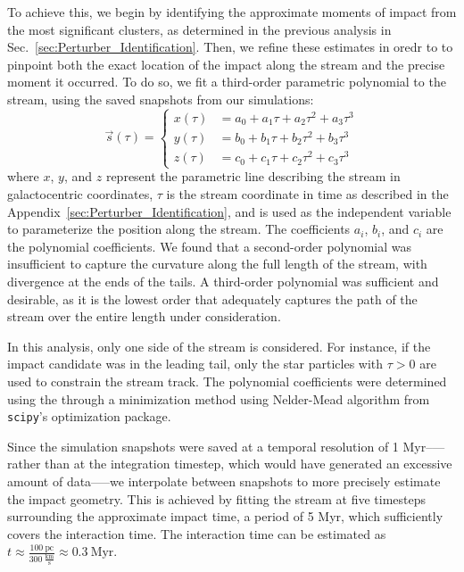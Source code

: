 \documentclass{aa}
\begin{document}
\begin{appendix}
      To achieve this, we begin by identifying the approximate moments of impact from the most significant clusters, as determined in the previous analysis in Sec.~\ref{sec:Perturber_Identification}. Then, we refine these estimates in oredr to to pinpoint both the exact location of the impact along the stream and the precise moment it occurred. To do so, we fit a third-order parametric polynomial to the stream, using the saved snapshots from our simulations:
      \begin{equation}
        \vec{s}(\tau) = 
        \left\{
          \begin{aligned}
            x(\tau) &= a_0 + a_1 \tau + a_2 \tau^2 + a_3 \tau^3 \\ 
            y(\tau) &= b_0 + b_1 \tau + b_2 \tau^2 + b_3 \tau^3 \\
            z(\tau) &= c_0 + c_1 \tau + c_2 \tau^2 + c_3 \tau^3
          \end{aligned}
        \right.
        \end{equation}  
      where $x$, $y$, and $z$ represent the parametric line describing the stream in galactocentric coordinates, $\tau$ is the stream coordinate in time as described in the Appendix~\ref{sec:Perturber_Identification}, and is used as the independent variable to parameterize the position along the stream. The coefficients $a_i$, $b_i$, and $c_i$ are the polynomial coefficients. We found that a second-order polynomial was insufficient to capture the curvature along the full length of the stream, with divergence at the ends of the tails. A third-order polynomial was sufficient and desirable, as it is the lowest order that adequately captures the path of the stream over the entire length under consideration.

      In this analysis, only one side of the stream is considered. For instance, if the impact candidate was in the leading tail, only the star particles with $\tau > 0$ are used to constrain the stream track. The polynomial coefficients were determined using the through a minimization method using Nelder-Mead algorithm from \texttt{scipy}'s optimization package.

      Since the simulation snapshots were saved at a temporal resolution of 1 Myr--—rather than at the integration timestep, which would have generated an excessive amount of data—--we interpolate between snapshots to more precisely estimate the impact geometry. This is achieved by fitting the stream at five timesteps surrounding the approximate impact time, a period of 5 Myr, which sufficiently covers the interaction time. The interaction time can be estimated as $t \approx \frac{100~\text{pc}}{300~\frac{\text{km}}{\text{s}}} \approx 0.3~\text{Myr}$.


\end{appendix}
\end{document}
